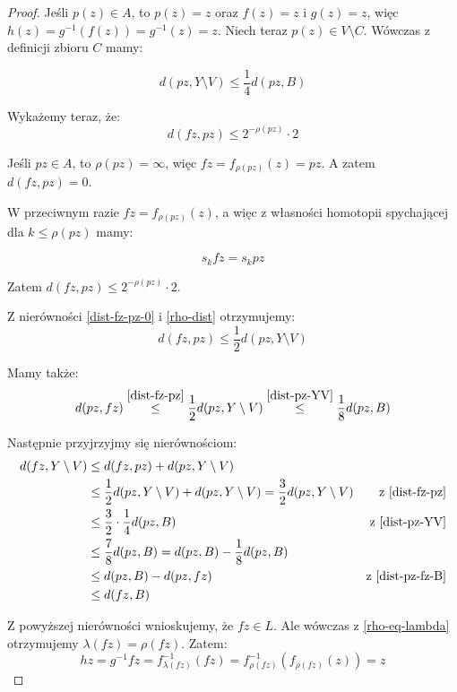 \begin{lem}
\begin{proof}
    Jeśli $p(z) \in A$, to $p(z) = z$ oraz $f(z) = z$ i $g(z) = z$, więc $h(z) = g^{-1}(f(z)) = g^{-1}(z) = z$. Niech teraz $p(z) \in V \setminus C$. Wówczas z definicji zbioru $C$ mamy:
    
    \begin{equation}
      \label{dist-pz-YV} d(pz, Y \setminus V) \leq \frac{1}{4} d(pz, B)
    \end{equation}
    
    Wykażemy teraz, że:
    \begin{equation}
      \label{dist-fz-pz-0}d(fz, pz) \leq 2^{-\rho(pz)} \cdot 2
    \end{equation}
    
    Jeśli $pz \in A$, to $\rho(pz) = \infty$, więc $fz = f_{\rho(pz)}(z) = pz$. A zatem $d(fz, pz) = 0$.
    
    W przeciwnym razie $fz = f_{\rho(pz)}(z)$, a więc z własności homotopii spychającej dla $k \leq \rho(pz)$ mamy:
    
    \[s_k fz = s_k pz\]
    
    Zatem $d(fz, pz) \leq 2^{-\rho(pz)} \cdot 2$.
    
    Z nierówności \eqref{dist-fz-pz-0} i \eqref{rho-dist} otrzymujemy:
    \begin{equation}
      \label{dist-fz-pz} d(fz, pz) \leq \frac{1}{2} d(pz, Y \setminus V)
    \end{equation}
    
    Mamy także:
    \begin{equation}
      \label{dist-pz-fz-B} d(pz, fz) \overset{\eqref{dist-fz-pz}}{\leq} \frac{1}{2} d(pz, Y \setminus V) \overset{\eqref{dist-pz-YV}}{\leq} \frac{1}{8} d(pz, B)
    \end{equation}


    Następnie przyjrzyjmy się nierównościom:
    \begin{align*}
      d(fz, Y \setminus V) & \leq d(fz, pz) + d(pz, Y \setminus V) \\
      & \leq \frac{1}{2} d(pz, Y \setminus V) + d(pz, Y \setminus V) = \frac{3}{2} d(pz, Y \setminus V) & \mbox{z \eqref{dist-fz-pz}} \\
      & \leq \frac{3}{2} \cdot \frac{1}{4} d(pz, B) & \mbox{z \eqref{dist-pz-YV}} \\
      & \leq \frac{7}{8} d(pz, B) = d(pz, B) - \frac{1}{8} d(pz, B) \\
      & \leq d(pz, B) - d(pz, fz) & \mbox{z \eqref{dist-pz-fz-B}} \\
      & \leq d(fz, B)
    \end{align*}
    
    Z powyższej nierówności wnioskujemy, że $fz \in L$. Ale wówczas z \eqref{rho-eq-lambda} otrzymujemy $\lambda(fz) = \rho(fz)$. Zatem:
    \[hz = g^{-1}fz = f^{-1}_{\lambda(fz)}(fz) = f^{-1}_{\rho(fz)}(f_{\rho(fz)}(z)) = z\]
  \end{proof}

\end{lem}

